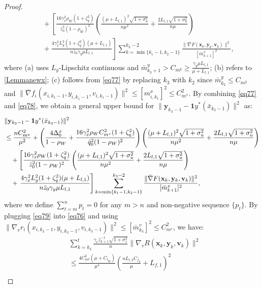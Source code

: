 \documentclass{article}
\theoremstyle{plain}
\theoremstyle{definition}
\theoremstyle{remark}
\begin{document}
\begin{proof}
\begin{align}
&\quad + \left[\frac{16 \gamma_x^2 \rho_W (1 + \zeta_q^2)}{\bar{z}_0^2(1 - \rho_W)^2} \left(\frac{(\mu+L_{l,1})^2\sqrt{1+\sigma_u^2}}{n\mu^2 }+\frac{2L_{l,1}\sqrt{1+\sigma_u^2}}{n\mu }\right)\right.\nonumber\\
&\quad +\left.\frac{4\gamma_x^2L_y^2(1+\zeta_q^2)(\mu + L_{l,1})}{n\bar{z}_0\gamma_y \mu L_{l,1}}\right]\sum_{k=\min\{k_1-1,k_2-1\}}^{k_3-2} 
 \frac{\| \bar{\nabla} F(\mathbf{x}_{k},\mathbf{y}_{k},\mathbf{v}_{k})\|^2}{[\bar{m}^x_{k+1}]^2},\label{eq78}
\end{align}
where (a) uses $L_y$-Lipschitz continuous and \(\bar{m}^y_{k_3+1} > C_{m^y} \geq \frac{\gamma_y \mu L_{l,1}}{\mu + L_{l,1}}\); (b) refers to \cref{Lemmanewx}; (c) follows from \cref{eq77} by replacing $k_3$ with $k_2$ since $\bar{m}_{k_2}^y \leq C_{m^y}$ and \(\|\bar{\nabla} f_i({x}_{i,k_1-1}, {y}_{i,k_1-1},{v}_{i,k_1-1})\|^2 \leq [m^x_{i,k_1}]^2 \leq C_{m^x}^2\).
By combining \cref{eq77} and \cref{eq78}, we obtain a general upper bound for $\|\mathbf{y}_{k_3-1}\!-\mathbf{1}y^*(\bar{x}_{k_3-1})\|^2$ as:
\begin{align}
&\|\mathbf{y}_{k_3-1}\!-\mathbf{1}y^*(\bar{x}_{k_3-1})\|^2\notag\\ &\leq
\frac{nC_{m^y}^2}{\mu^2}+\left(\frac{4\Delta_0^x}{1-\rho_W}+\frac{16 \gamma_x^2 \rho_WC_{m^x}^2 (1 + \zeta_q^2)}{\bar{q}_0^2(1 - \rho_W)^2} \right)\left(\frac{(\mu+L_{l,1})^2\sqrt{1+\sigma_u^2}}{n\mu^2 }+\frac{2L_{l,1}\sqrt{1+\sigma_u^2}}{n\mu }\right)\notag \\
&\quad + \left[\frac{16 \gamma_x^2 \rho_W (1 + \zeta_q^2)}{\bar{z}_0^2(1 - \rho_W)^2} \left(\frac{(\mu+L_{l,1})^2\sqrt{1+\sigma_u^2}}{n\mu^2 }+\frac{2L_{l,1}\sqrt{1+\sigma_u^2}}{n\mu }\right)\right.\nonumber\\
&\quad +\left.\frac{4\gamma_x^2L_y^2(1+\zeta_q^2)(\mu + L_{l,1})}{n\bar{z}_0\gamma_y \mu L_{l,1}}\right]\sum_{k=\min\{k_1-1,k_2-1\}}^{k_3-2} 
 \frac{\| \bar{\nabla} F(\mathbf{x}_{k},\mathbf{y}_{k},\mathbf{v}_{k})\|^2}{[\bar{m}^x_{k+1}]^2},\label{eq79}
\end{align}
where we define $\sum_{t=m}^n p_t = 0$ for any $m > n$ and non-negative sequence $\{p_t\}$. By plugging \cref{eq79} into \cref{eq76} and using $\|\nabla_v r_i(x_{i,k_3-1}, y_{i,k_3-1}, v_{i,k_3-1})\|^2 \leq [\bar{m}^v_{k_3}]^2 \leq C_{m^v}^2$, we have:
\begin{align}
&\sum_{k=k_3}^t \frac{\gamma_v\bar{z}_{k+1}^{-1}\sqrt{1+\sigma_z^2}}{n} \|\nabla_v R(\mathbf{x}_k, \mathbf{y}_k, \mathbf{v}_k)\|^2 \nonumber\\
&\leq 
\frac{4C_{m^y}^2(\mu + C_{l_{yy}})}{\mu^4}\left(\frac{nL_{l,2}C_{f_y}}{\mu}+L_{f,1}\right)^2\nonumber\\

\end{align}
\end{proof}
\end{document}
